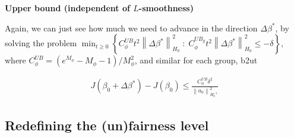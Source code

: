 \documentclass[11pt]{article}
\theoremstyle{plain}
\theoremstyle{definition}
\newcommand{\norm}[1]{\left\lVert #1 \right\rVert}
\newcommand{\1}{\mathbf{1}}
\begin{document}
\textbf{Upper bound (independent of $L$-smoothness)}

Again, we can just see how much we need to advance in the direction $\Delta \beta^*$, by solving the problem $\min_{t \geq 0 } \left\{C_\phi^{UB} t^2\norm{\Delta \beta^*}_{H_0}^2 \;:\;  C_\phi^{UB_g}t^2 \norm{\Delta \beta^*}_{H_0}^2 \leq -\delta \right\}$, where $C_\phi^{UB}=(e^{M_\phi}-M_\phi-1 )/M_\phi^2$, and similar for each group, b2ut 

\begin{align}
    \boxed{J(\beta_0 + \Delta \beta^*) - J(\beta_0) \leq \frac{C_\phi^{UB}\delta^2}{\norm{a_0}_{H_0^{-1}}^2}} 
\end{align}



\subsection{Redefining the (un)fairness level}
\end{document}
